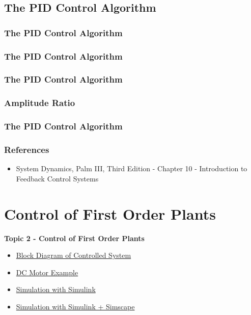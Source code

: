 \documentclass[fleqn]{beamer} %
\newcommand{\sectionIItitle}{Control of First Order Plants}
\newcommand{\sectionIsubsectionIVtitle}{The PID Control Algorithm}
\newcommand{\sectionIIsubsectionItitle}{Block Diagram of Controlled System}
\newcommand{\sectionIIsubsectionIItitle}{DC Motor Example}
\newcommand{\sectionIIsubsectionIIItitle}{Simulation with Simulink}
\newcommand{\sectionIIsubsectionIVtitle}{Simulation with Simulink + Simscape}
\begin{document}
		\subsection{\sectionIsubsectionIVtitle}\label{sectionIsubsectionIV}

			\begin{frame}
				\frametitle{\sectionIsubsectionIVtitle}
				\bigskip

				\btVFill
			\end{frame}	

			\begin{frame}
				\frametitle{\sectionIsubsectionIVtitle}
				\bigskip

				\btVFill
			\end{frame}	

			\begin{frame}
				\frametitle{\sectionIsubsectionIVtitle}
				\bigskip
				\frametitle{Amplitude Ratio}

				\btVFill
			\end{frame}

			\begin{frame}
				\frametitle{\sectionIsubsectionIVtitle}
				\bigskip

				\frametitle{References}

				\begin{itemize}
					\item System Dynamics, Palm III, Third Edition - Chapter 10 - Introduction to Feedback Control Systems
				\end{itemize}
			
				\btVFill
			\end{frame}
	
	\section{\sectionIItitle}\label{sectionII}

		\begin{frame}
			\large \textbf{Topic 2 - \sectionIItitle} \vspace{3mm}\\

			\begin{itemize}
				\item \hyperlink{sectionIIsubsectionI}{\sectionIIsubsectionItitle} \vspc %
				\item \hyperlink{sectionIIsubsectionII}{\sectionIIsubsectionIItitle} \vspc %
				\item \hyperlink{sectionIIsubsectionIII}{\sectionIIsubsectionIIItitle} \vspc %
				\item \hyperlink{sectionIIsubsectionIV}{\sectionIIsubsectionIVtitle} \vspc %
			\end{itemize}

		\end{frame}
\end{document}
